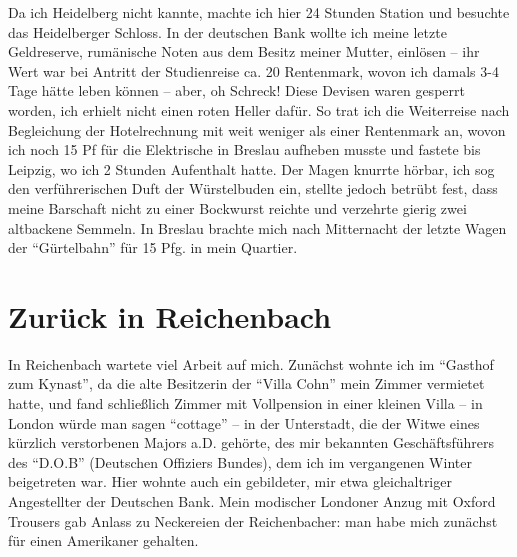 \documentclass[a5paper,pagesize,10pt,twoside=true]{scrbook}
\renewcommand{\marginpar}[2][]{}
\begin{document}
Da ich Heidelberg nicht kannte, machte ich hier 24 Stunden Station und besuchte das Heidelberger Schloss. In der deutschen Bank wollte ich meine letzte Geldreserve, rumänische Noten aus dem Besitz meiner Mutter, einlösen -- ihr Wert war bei Antritt der Studienreise ca. 20 Rentenmark, wovon ich damals 3-4 Tage hätte leben können -- aber, oh Schreck! Diese Devisen waren gesperrt worden, ich erhielt nicht einen roten Heller dafür. So trat ich die Weiterreise nach Begleichung der Hotelrechnung mit weit weniger als einer Rentenmark an, wovon ich noch 15 Pf für die Elektrische in Breslau aufheben musste und fastete bis Leipzig, wo ich 2 Stunden Aufenthalt hatte. Der Magen knurrte hörbar, ich sog den verführerischen Duft der Würstelbuden ein, stellte jedoch betrübt fest, dass meine Barschaft nicht zu einer Bockwurst reichte und verzehrte gierig zwei altbackene Semmeln. In Breslau brachte mich nach Mitternacht der letzte Wagen der \enquote{Gürtelbahn} für 15 Pfg. in mein Quartier.

\marginpar{528}
\section{Zurück in Reichenbach}
In Reichenbach wartete viel Arbeit auf mich. Zunächst wohnte ich im \enquote{Gasthof zum Kynast}, da die alte Besitzerin der \enquote{Villa Cohn} mein Zimmer vermietet hatte, und fand schließlich Zimmer mit Vollpension in einer kleinen Villa -- in London würde man sagen \enquote{cottage} -- in der Unterstadt, die der Witwe eines kürzlich verstorbenen Majors a.D. gehörte, des mir bekannten Geschäftsführers des \enquote{D.O.B} (Deutschen Offiziers Bundes), dem ich im vergangenen Winter beigetreten war. Hier wohnte auch ein gebildeter, mir etwa gleichaltriger Angestellter der Deutschen Bank. Mein modischer Londoner Anzug mit Oxford Trousers gab Anlass zu Neckereien der Reichenbacher: man habe mich zunächst für einen Amerikaner gehalten.
\end{document}
